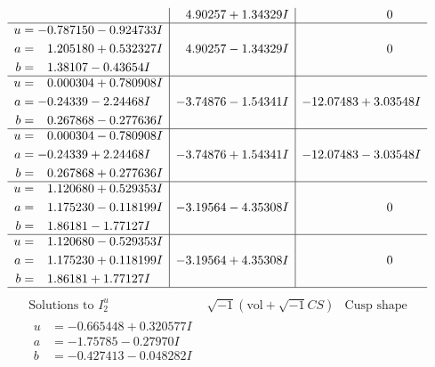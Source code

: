 \documentclass[1p]{elsarticle_modified}
\theoremstyle{definition}
\newcommand{\I}{\sqrt{-1}}
\begin{document}
$$\begin{array}{c|c|c}
 & \phantom{-}4.90257 + 1.34329 I & \phantom{-0.000000 } 0 \\ \hline\begin{aligned}
u &= -0.787150 - 0.924733 I \\
a &= \phantom{-}1.205180 + 0.532327 I \\
b &= \phantom{-}1.38107 - 0.43654 I\end{aligned}
 & \phantom{-}4.90257 - 1.34329 I & \phantom{-0.000000 } 0 \\ \hline\begin{aligned}
u &= \phantom{-}0.000304 + 0.780908 I \\
a &= -0.24339 - 2.24468 I \\
b &= \phantom{-}0.267868 - 0.277636 I\end{aligned}
 & -3.74876 - 1.54341 I & -12.07483 + 3.03548 I \\ \hline\begin{aligned}
u &= \phantom{-}0.000304 - 0.780908 I \\
a &= -0.24339 + 2.24468 I \\
b &= \phantom{-}0.267868 + 0.277636 I\end{aligned}
 & -3.74876 + 1.54341 I & -12.07483 - 3.03548 I \\ \hline\begin{aligned}
u &= \phantom{-}1.120680 + 0.529353 I \\
a &= \phantom{-}1.175230 - 0.118199 I \\
b &= \phantom{-}1.86181 - 1.77127 I\end{aligned}
 & -3.19564 - 4.35308 I & \phantom{-0.000000 } 0 \\ \hline\begin{aligned}
u &= \phantom{-}1.120680 - 0.529353 I \\
a &= \phantom{-}1.175230 + 0.118199 I \\
b &= \phantom{-}1.86181 + 1.77127 I\end{aligned}
 & -3.19564 + 4.35308 I & \phantom{-0.000000 } 0\\
 \hline 
 \end{array}$$\newpage$$\begin{array}{c|c|c}  
\text{Solutions to }I^u_{2}& \I (\text{vol} + \sqrt{-1}CS) & \text{Cusp shape}\\
 \hline 
\begin{aligned}
u &= -0.665448 + 0.320577 I \\
a &= -1.75785 - 0.27970 I \\
b &= -0.427413 - 0.048282 I\end{aligned}

\end{array}$$
\end{document}
